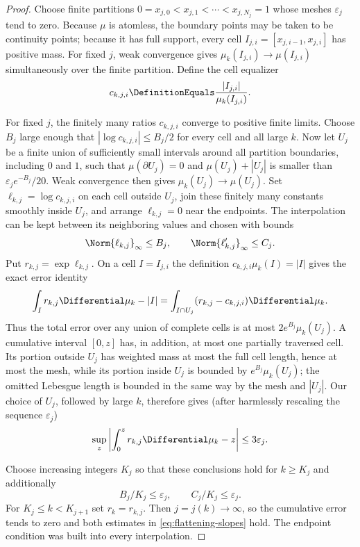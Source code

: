 \documentclass[11pt,oneside]{article}
\numberwithin{equation}{section}
\theoremstyle{definition}
\theoremstyle{remark}
\begin{document}
\begin{proof}
Choose finite partitions
$0=x_{j,0}<x_{j,1}<\cdots<x_{j,N_j}=1$ whose meshes
$\varepsilon_j$ tend to zero.  Because $\mu$ is atomless, the boundary points may be taken
to be continuity points; because it has full support, every cell
$I_{j,i}=[x_{j,i-1},x_{j,i}]$ has positive mass.  For fixed $j$, weak convergence gives
$\mu_k(I_{j,i})\to\mu(I_{j,i})$ simultaneously over the finite partition.  Define the
cell equalizer
\[
 c_{k,j,i}\DefinitionEquals\frac{|I_{j,i}|}{\mu_k(I_{j,i})}.
\]

For fixed $j$, the finitely many ratios $c_{k,j,i}$ converge to positive finite limits.
Choose $B_j$ large enough that $|\log c_{k,j,i}|\le B_j/2$ for every cell and all large
$k$.  Now let $U_j$ be a finite union of sufficiently small intervals around all partition
boundaries, including $0$ and $1$, such that $\mu(\partial U_j)=0$ and
$\mu(U_j)+|U_j|$ is smaller than $\varepsilon_je^{-B_j}/20$.  Weak convergence then gives
$\mu_k(U_j)\to\mu(U_j)$.  Set $\ell_{k,j}=\log c_{k,j,i}$ on each cell outside $U_j$, join
these finitely many constants smoothly inside $U_j$, and arrange $\ell_{k,j}=0$ near the
endpoints.  The interpolation can be kept between its neighboring values and chosen with
bounds
\[
 \Norm{\ell_{k,j}}_\infty\le B_j,
 \qquad
 \Norm{\ell_{k,j}'}_\infty\le C_j.
\]
Put $r_{k,j}=\exp\ell_{k,j}$.  On a cell $I=I_{j,i}$ the definition
$c_{k,j,i}\mu_k(I)=|I|$ gives the exact error identity
\[
 \int_I r_{k,j}\Differential\mu_k-|I|
 =\int_{I\cap U_j}(r_{k,j}-c_{k,j,i})\Differential\mu_k.
\]
Thus the total error over any union of complete cells is at most
$2e^{B_j}\mu_k(U_j)$.  A cumulative interval $[0,z]$ has, in addition, at most one
partially traversed cell.  Its portion outside $U_j$ has weighted mass at most the full
cell length, hence at most the mesh, while its portion inside $U_j$ is bounded by
$e^{B_j}\mu_k(U_j)$; the omitted Lebesgue length is bounded in the same way by the mesh
and $|U_j|$.  Our choice of $U_j$, followed by large $k$, therefore gives (after harmlessly
rescaling the sequence $\varepsilon_j$)
\[
 \sup_z\left|\int_0^zr_{k,j}\Differential\mu_k-z\right|\le3\varepsilon_j.
\]

Choose increasing integers $K_j$ so that these conclusions hold for $k\ge K_j$ and
additionally
\[
 B_j/K_j\le\varepsilon_j,
 \qquad C_j/K_j\le\varepsilon_j.
\]
For $K_j\le k<K_{j+1}$ set $r_k=r_{k,j}$.  Then $j=j(k)\to\infty$, so the cumulative
error tends to zero and both estimates in \eqref{eq:flattening-slopes} hold.  The endpoint
condition was built into every interpolation.
\end{proof}
\end{document}
